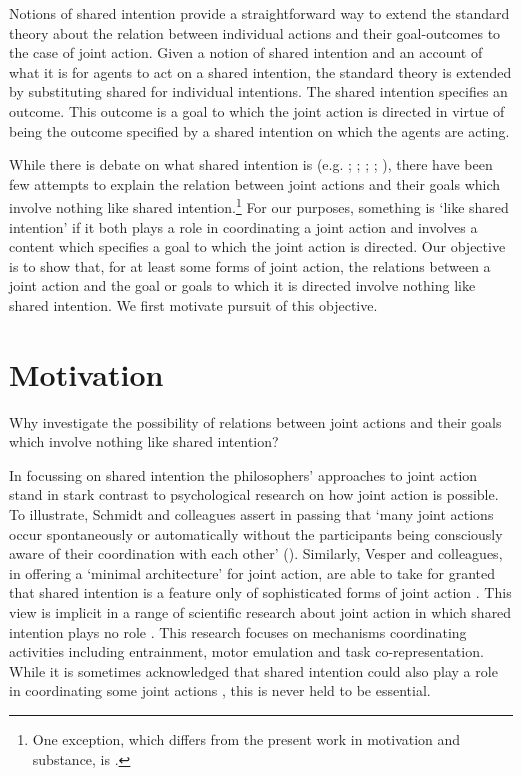 \documentclass[12pt,a4paper]{extarticle}
\begin{document}
Notions of shared intention provide a straightforward way to extend the standard theory about the relation between individual actions and their goal-outcomes to the case of joint action.  
Given a notion of shared intention and an account of what it is for agents to act on a shared intention, 
the standard theory is extended by substituting shared for individual intentions.  The shared intention specifies an outcome.  This outcome is a goal to which the joint action is directed in virtue of being the outcome specified by a shared intention on which the agents are acting.

While there is debate on what shared intention is (e.g. 
	\citealp{Kutz:2000si}; 
	\citealp{Tollefsen:2005vh}; 
	\citealp{gilbert_walking_1990};
	\citealp[pp.\ 74--81]{miller_social_2001};
	\citealp{tuomela_collective_2000}), 
there have been few attempts to explain the relation between joint actions and their goals which  involve nothing like shared intention.\footnote{ 
One exception, which differs from the present work in motivation and substance, is \citet{Roth:2004ki}.
}
For our purposes, something is `like shared intention' if it both plays a role in coordinating a joint action and  involves a content which specifies a goal to which the joint action is directed.
Our objective is to show that, for at least some forms of joint action, the relations between a joint action and the goal or goals to which it is directed involve nothing like shared intention.  
We first motivate pursuit of this objective.

\section{Motivation}
Why investigate the possibility of relations between joint actions and their goals which involve nothing like shared intention?
  
In focussing on shared intention the philosophers' approaches to joint action stand in stark contrast to psychological research on how joint action is possible.
To illustrate, Schmidt and colleagues assert in passing that `many joint actions occur spontaneously or automatically without the participants being consciously aware of their coordination with each other' (\citeyear[p. 7]{schmidt_understanding_2010}).
Similarly, Vesper and colleagues, in offering a `minimal architecture' for joint action, are able to take for granted that shared intention is a feature only of sophisticated forms of joint action \citep{vesper_minimal_2010}.
This view is implicit in a range of scientific research about joint action in which shared intention plays no role 
	\citep[as reviewed in][]{%
		Knoblich:2010fk,
		Sebanz:2006yq%
	}.
This research focuses on mechanisms coordinating activities including entrainment, motor emulation and task co-representation.  
While it is sometimes acknowledged that shared intention could also play a role in coordinating some joint actions \citep[e.g.][]{Knoblich:2008hy}, this is never held to be essential.
\end{document}
